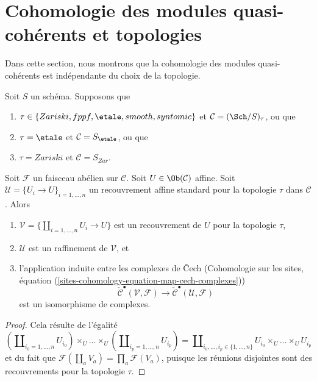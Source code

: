 \section{Cohomologie des modules quasi-cohérents et topologies}
\label{section-quasi-coherent-cohomology}

\noindent
Dans cette section, nous montrons que la cohomologie des modules
quasi-cohérents est indépendante du choix de la topologie.

\begin{lemma}
\label{lemma-standard-covering-Cech}
Soit $S$ un schéma. Supposons que
\begin{enumerate}
\item[(a)] $\tau \in \{Zariski, \linebreak[0] fppf, \linebreak[0]
\etale, \linebreak[0] smooth, \linebreak[0] syntomic\}$ et
$\mathcal{C} = (\Sch/S)_\tau$, ou que
\item[(b)] $\tau = \etale$ et $\mathcal{C} = S_\etale$, ou que
\item[(c)] $\tau = Zariski$ et $\mathcal{C} = S_{Zar}$.
\end{enumerate}
Soit $\mathcal{F}$ un faisceau abélien sur $\mathcal{C}$.
Soit $U \in \Ob(\mathcal{C})$ affine.
Soit $\mathcal{U} = \{U_i \to U\}_{i = 1, \ldots, n}$ un recouvrement
affine standard pour la topologie $\tau$ dans $\mathcal{C}$. Alors
\begin{enumerate}
\item $\mathcal{V} = \{\coprod_{i = 1, \ldots, n} U_i \to U\}$ est un
recouvrement de $U$ pour la topologie $\tau$,
\item $\mathcal{U}$ est un raffinement de $\mathcal{V}$, et
\item l'application induite entre les complexes de {\v C}ech
(Cohomologie sur les sites,
équation (\ref{sites-cohomology-equation-map-cech-complexes}))
$$
\check{\mathcal{C}}^\bullet(\mathcal{V}, \mathcal{F})
\longrightarrow
\check{\mathcal{C}}^\bullet(\mathcal{U}, \mathcal{F})
$$
est un isomorphisme de complexes.
\end{enumerate}
\end{lemma}

\begin{proof}
Cela résulte de l'égalité
$$
(\coprod\nolimits_{i_0 = 1, \ldots, n} U_{i_0}) \times_U
\ldots \times_U
(\coprod\nolimits_{i_p = 1, \ldots, n} U_{i_p})
=
\coprod\nolimits_{i_0, \ldots, i_p \in \{1, \ldots, n\}}
U_{i_0} \times_U \ldots \times_U U_{i_p}
$$
et du fait que
$\mathcal{F}(\coprod_a V_a) = \prod_a \mathcal{F}(V_a)$, puisque les
réunions disjointes sont des recouvrements pour la topologie $\tau$.
\end{proof}

